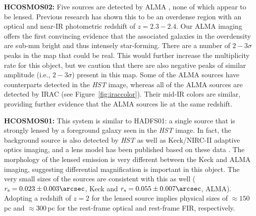 \documentclass[iop]{emulateapj}
\begin{document}


{\bf HCOSMOS02:} Five sources are detected by ALMA \citep[the brightest of
which was already known;][]{Smolcic:2012zl}, none of which appear to be
lensed.  Previous research has shown this to be an overdense region \citep[this
object is called COSBO3 in][]{Aravena:2010fr} with an optical and near-IR
photometric redshift of $z=2.3-2.4$.  Our ALMA imaging offers the first
convincing evidence that the associated galaxies in the overdensity are sub-mm
bright and thus intensely star-forming.  There are a number of $2-3\sigma$
peaks in the map that could be real.  This would further increase the
multiplicity rate for this object, but we caution that there are also negative
peaks of similar amplitude (i.e., $2-3\sigma$) present in this map.  Some of
the ALMA sources have counterparts detected in the {\it HST} image, whereas all
of the ALMA sources are detected by IRAC (see Figure~\ref{fig:iraccolor}).
Their mid-IR colors are similar, providing further evidence that the ALMA
sources lie at the same redshift.  

{\bf HCOSMOS01:} This system is similar to HADFS01: a single source that is
strongly lensed by a foreground galaxy seen in the {\it HST} image.  In fact,
the background source is also detected by {\it HST} as well as Keck/NIRC-II
adaptive optics imaging, and a lens model has been published based on these
data \citep{Calanog:2014lr}.  The morphology of the lensed emission is very
different between the Keck and ALMA imaging, suggesting differential
magnification is important in this object.  The very small sizes of the sources
are consistent with this as well ($r_{\rm s} = 0.023 \pm 0.003\arcsec$, Keck
and $r_{\rm s} = 0.055 \pm 0.007\arcsec$, ALMA).  Adopting a redshift of $z=2$
for the lensed source implies physical sizes of $\approx 150\,$pc and $\approx
300\,$pc for the rest-frame optical and rest-frame FIR, respectively.
\end{document}
